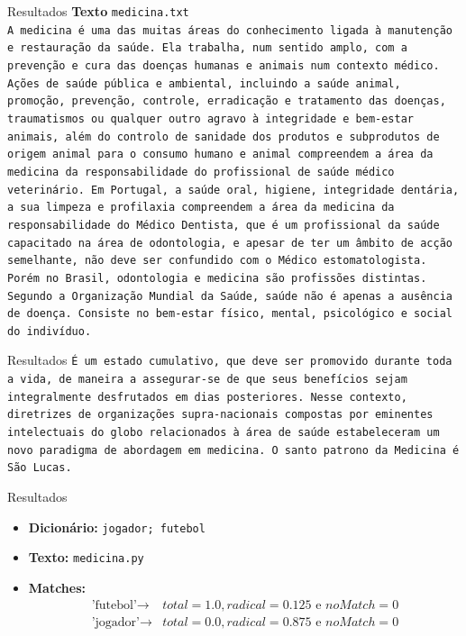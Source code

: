\documentclass{beamer}
\begin{document}
	\begin{frame}{Resultados}
		\textbf{Texto }\texttt{medicina.txt}\\
		\texttt{\tiny A medicina é uma das muitas áreas do conhecimento ligada à manutenção e restauração da saúde. Ela trabalha, num sentido amplo, com a prevenção e cura das doenças humanas e animais num contexto médico.
			Ações de saúde pública e ambiental, incluindo a saúde animal, promoção, prevenção, controle, erradicação e tratamento das doenças, traumatismos ou qualquer outro agravo à integridade e bem-estar animais, além do controlo de sanidade dos produtos e subprodutos de origem animal para o consumo humano e animal compreendem a área da medicina da responsabilidade do profissional de saúde médico veterinário.
			Em Portugal, a saúde oral, higiene, integridade dentária, a sua limpeza e profilaxia compreendem a área da medicina da responsabilidade do Médico Dentista, que é um profissional da saúde capacitado na área de odontologia, e apesar de ter um âmbito de acção semelhante, não deve ser confundido com o Médico estomatologista. Porém no Brasil, odontologia e medicina são profissões distintas.
			Segundo a Organização Mundial da Saúde, saúde não é apenas a ausência de doença. Consiste no bem-estar físico, mental, psicológico e social do indivíduo. }
	\end{frame}
	
	\begin{frame}{Resultados}
		\texttt{\tiny É um estado cumulativo, que deve ser promovido durante toda a vida, de maneira a assegurar-se de que seus benefícios sejam integralmente desfrutados em dias posteriores. Nesse contexto, diretrizes de organizações supra-nacionais compostas por eminentes intelectuais do globo relacionados à área de saúde estabeleceram um novo paradigma de abordagem em medicina. O santo patrono da Medicina é São Lucas.}
	\end{frame}
	
	
	\begin{frame}{Resultados}
		\begin{itemize}
			\item \textbf{Dicionário:  }\texttt{jogador;  futebol}\\
			\item \textbf{Texto:  } \texttt{medicina.py}
			\item \textbf{Matches:  } 
				\begin{align*}
					\text{'futebol'} \rightarrow &total = 1.0, radical = 0.125 \text{ e } noMatch = 0\\
					\text{'jogador'} \rightarrow &total = 0.0, radical = 0.875 \text{ e } noMatch = 0
				\end{align*}
		\end{itemize}
	\end{frame}
\end{document}
